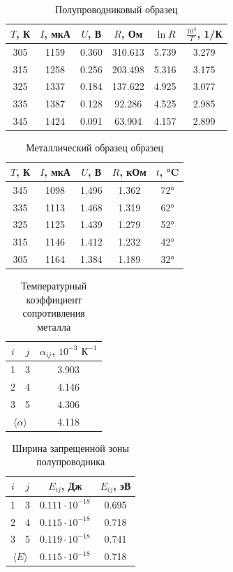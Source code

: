 \documentclass{article}%
\begin{document}
\begin{table}[h!]%
\centering%
\begin{tabular}{|c|c|c|c|c|c|}%
\hline%
$T$, К&$I$, мкА&$U$, В&$R$, Ом&$\ln{R}$&$\frac{10^3}{T}$, 1/К\\%
\hline%
305&1159&0.360&310.613&5.739&3.279\\%
\hline%
315&1258&0.256&203.498&5.316&3.175\\%
\hline%
325&1337&0.184&137.622&4.925&3.077\\%
\hline%
335&1387&0.128&92.286&4.525&2.985\\%
\hline%
345&1424&0.091&63.904&4.157&2.899\\%
\hline%
\end{tabular}%
\caption{Полупроводниковый образец}%
\end{table}

%


\begin{table}[h!]%
\centering%
\begin{tabular}{|c|c|c|c|c|}%
\hline%
$T$, К&$I$, мкА&$U$, В&$R$, кОм&$t$, °C\\%
\hline%
345&1098&1.496&1.362&72°\\%
\hline%
335&1113&1.468&1.319&62°\\%
\hline%
325&1125&1.439&1.279&52°\\%
\hline%
315&1146&1.412&1.232&42°\\%
\hline%
305&1164&1.384&1.189&32°\\%
\hline%
\end{tabular}%
\caption{Металлический образец образец}%
\end{table}

%


\begin{table}[h!]%
\centering%
\begin{tabular}{|c|c|c|}%
\hline%
$i$&$j$&$\alpha_{ij}$, $10^{-3}$ $\text{К}^{-1}$\\%
\hline%
1&3&3.903\\%
\hline%
2&4&4.146\\%
\hline%
3&5&4.306\\%
\hline%
\multicolumn{2}{|c|}{$\langle \alpha \rangle$}&4.118\\%
\hline%
\end{tabular}%
\caption{Температурный коэффициент сопротивления металла}%
\end{table}

%


\begin{table}[h!]%
\centering%
\begin{tabular}{|c|c|c|c|}%
\hline%
$i$&$j$&$E_{ij}$, Дж&$E_{ij}$, эВ\\%
\hline%
1&3&$0.111 \cdot 10^{-18}$&0.695\\%
\hline%
2&4&$0.115 \cdot 10^{-18}$&0.718\\%
\hline%
3&5&$0.119 \cdot 10^{-18}$&0.741\\%
\hline%
\multicolumn{2}{|c|}{$\langle E \rangle$}&$0.115 \cdot 10^{-18}$&0.718\\%
\hline%
\end{tabular}%
\caption{Ширина запрещенной зоны полупроводника}%
\end{table}
\end{document}
